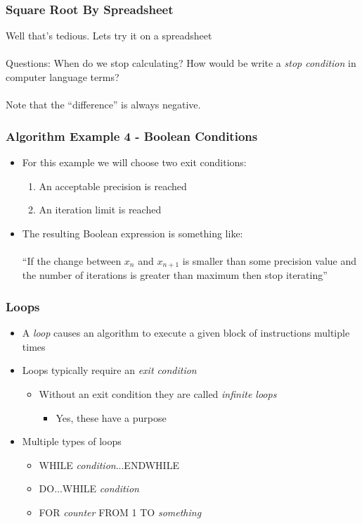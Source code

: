 \documentclass[14pt]{beamer}
\begin{document}
\begin{frame}
\frametitle{Square Root By Spreadsheet}
\begin{center}
Well that's tedious. Lets try it on a spreadsheet
~\\
~\\
Questions: When do we stop calculating? How would be write a \textit{stop condition} in computer language terms?\\
~\\
Note that the ``difference'' is always negative.
\end{center}
\end{frame}

\begin{frame}
\frametitle{Algorithm Example 4 - Boolean Conditions}
\begin{itemize}
\item For this example we will choose two exit conditions:
	\begin{enumerate}
		\item An acceptable precision is reached
		\item An iteration limit is reached
	\end{enumerate}
\item The resulting Boolean expression is something like:\\
~\\
``If the change between $x_n$ and $x_{n+1}$ is smaller than some precision value and the number of iterations is greater than maximum then stop iterating''
\end{itemize}
\end{frame}

\begin{frame}
\frametitle{Loops}
\begin{itemize}
\item A \textit{loop} causes an algorithm to execute a given block of instructions multiple times
\item Loops typically require an \textit{exit condition}
	\begin{itemize}
		\item Without an exit condition they are called \textit{infinite loops}
		\begin{itemize}
			\item Yes, these have a purpose
		\end{itemize}
	\end{itemize}
\item Multiple types of loops
	\begin{itemize}
		\item WHILE \textit{condition}...ENDWHILE
		\item DO...WHILE \textit{condition}
		\item FOR \textit{counter} FROM 1 TO \textit{something}
	\end{itemize}
\end{itemize}
\end{frame}
\end{document}
